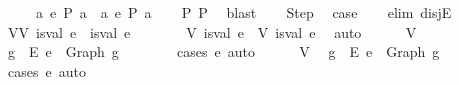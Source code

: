 \begin{isabellebody}
\ \ \ \ \ {\isacharparenleft}{\kern0pt}{\isasymexists}a{\isachardot}{\kern0pt}\ e{}\ {\isacharminus}{\kern0pt}{\isachargreater}{\kern0pt}{\isacharbraceleft}{\kern0pt}P{\isacharbraceright}{\kern0pt}\ a{\isacharparenright}{\kern0pt}\ {\isasymor}\ {\isacharparenleft}{\kern0pt}{\isasymexists}a{\isachardot}{\kern0pt}\ e{}\ {\isacharminus}{\kern0pt}{\isachargreater}{\kern0pt}{\isacharbraceleft}{\kern0pt}P{\isacharbraceright}{\kern0pt}\ a{\isacharparenright}{\kern0pt}{\isachardoublequoteclose}\isanewline
\ \ \isamarkupfalse%
\ P{}\ P{}\ \isamarkupfalse%
\ blast\isanewline
\isanewline
\ \ \isamarkupfalse%
\ Step\ \isamarkupfalse%
\ {\isacharquery}{\kern0pt}case\isanewline
\ \ \isamarkupfalse%
\ {\isacharparenleft}{\kern0pt}elim\ disjE{\isacharparenright}{\kern0pt}\isanewline
\ \ \ \ \isamarkupfalse%
\ VV{\isacharcolon}{\kern0pt}\ {\isachardoublequoteopen}is{\isacharunderscore}{\kern0pt}val\ e{}\ {\isasymand}\ is{\isacharunderscore}{\kern0pt}val\ e{}{\isachardoublequoteclose}\isanewline
\ \ \ \ \isamarkupfalse%
\ \isamarkupfalse%
\ V{}{\isacharcolon}{\kern0pt}\ {\isachardoublequoteopen}is{\isacharunderscore}{\kern0pt}val\ e{}{\isachardoublequoteclose}\ \ V{}{\isacharcolon}{\kern0pt}\ {\isachardoublequoteopen}is{\isacharunderscore}{\kern0pt}val\ e{}{\isachardoublequoteclose}\ \isamarkupfalse%
\ auto\isanewline
\isanewline
\ \ \ \ \isamarkupfalse%
\ V{}\ \isamarkupfalse%
\ g{}\ \ E{}{\isacharcolon}{\kern0pt}\ {\isachardoublequoteopen}e{}\ {\isacharequal}{\kern0pt}\ Graph\ g{}{\isachardoublequoteclose}\isanewline
\ \ \ \ \ \ \isamarkupfalse%
\ {\isacharparenleft}{\kern0pt}cases\ e{}{\isacharparenright}{\kern0pt}\ auto\isanewline
\ \ \ \ \isamarkupfalse%
\ V{}\ \isamarkupfalse%
\ g{}\ \ E{}{\isacharcolon}{\kern0pt}\ {\isachardoublequoteopen}e{}\ {\isacharequal}{\kern0pt}\ Graph\ g{}{\isachardoublequoteclose}\isanewline
\ \ \ \ \ \ \isamarkupfalse%
\ {\isacharparenleft}{\kern0pt}cases\ e{}{\isacharparenright}{\kern0pt}\ auto\isanewline
\isanewline

\end{isabellebody}
